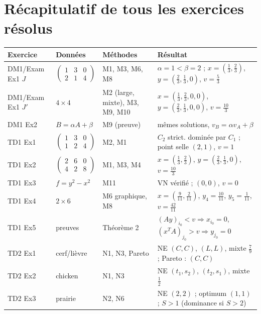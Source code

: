 \documentclass[11pt,a4paper]{article}
\begin{document}
\section{Récapitulatif de tous les exercices résolus}\label{sec:recap}
\begin{center}
\small
\renewcommand{\arraystretch}{1.35}
\begin{tabular}{|p{2.4cm}|p{4.4cm}|p{3.4cm}|p{5.0cm}|}
\hline
\textbf{Exercice} & \textbf{Données} & \textbf{Méthodes} & \textbf{Résultat}\\\hline
DM1/Exam Ex1 $J$ & $\begin{pmatrix}1&3&0\\2&1&4\end{pmatrix}$ & M1, M3, M6, M8 & $\alpha=1<\beta=2$ ; $x=(\frac13,\frac23)$, $y=(\frac23,\frac13,0)$, $v=\frac53$\\\hline
DM1/Exam Ex1 $J'$ & $4\times4$ & M2 (large, mixte), M3, M9, M10 & $x=(\frac13,\frac23,0,0)$, $y=(\frac23,\frac13,0,0)$, $v=\frac{10}3$\\\hline
DM1 Ex2 & $B=\alpha A+\beta$ & M9 (preuve) & mêmes solutions, $v_B=\alpha v_A+\beta$\\\hline
TD1 Ex1 & $\begin{pmatrix}1&3&0\\1&2&4\end{pmatrix}$ & M2, M1 & $C_2$ strict. dominée par $C_1$ ; point selle $(2,1)$, $v=1$\\\hline
TD1 Ex2 & $\begin{pmatrix}2&6&0\\4&2&8\end{pmatrix}$ & M1, M3, M4 & $x=(\frac13,\frac23)$, $y=(\frac23,\frac13,0)$, $v=\frac{10}3$\\\hline
TD1 Ex3 & $f=y^2-x^2$ & M11 & VN vérifié ; $(0,0)$, $v=0$\\\hline
TD1 Ex4 & $2\times6$ & M6 graphique, M8 & $x=(\frac9{11},\frac2{11})$, $y_4=\frac{10}{11}$, $y_5=\frac1{11}$, $v=\frac{42}{11}$\\\hline
TD1 Ex5 & preuves & Théorème 2 & $(Ay)_{i_0}<v\Rightarrow x_{i_0}=0$, $(x^TA)_{j_0}>v\Rightarrow y_{j_0}=0$\\\hline
TD2 Ex1 & cerf/lièvre & N1, N3, Pareto & NE $(C,C)$, $(L,L)$, mixte $\frac79$ ; Pareto : $(C,C)$\\\hline
TD2 Ex2 & chicken & N1, N3 & NE $(t_1,s_2)$, $(t_2,s_1)$, mixte $\frac12$\\\hline
TD2 Ex3 & prairie & N2, N6 & NE $(2,2)$ ; optimum $(1,1)$ ; $S>1$ (dominance si $S>2$)\\\hline

\end{tabular}
\end{center}
\end{document}
